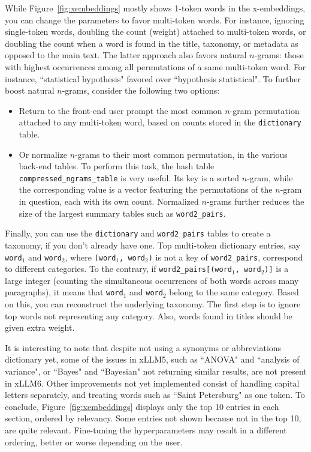 \documentclass[oneside,10pt]{book}
\begin{document}
While Figure~\ref{fig:xembeddings} mostly shows 1-token words in the x-embeddings, you can change the parameters to favor multi-token words. For instance, ignoring single-token words, doubling the count (weight) attached to multi-token words, or doubling the count when a word is found in the title, taxonomy, or metadata as opposed to the main text. The latter approach also favors natural \textcolor{index}{$n$-grams}: those with highest occurrences among all permutations of a same multi-token word. For instance, ``statistical hypothesis" favored over ``hypothesis statistical". To further boost natural $n$-grams, consider the following two options: 
\vspace{1ex}
\begin{itemize}
\item Return to the front-end user prompt the most common $n$-gram permutation attached to any multi-token word, based on counts stored in the \texttt{dictionary} table. 
\item Or  normalize $n$-grams to their most common permutation, in the various back-end tables. To perform this task, the hash table
 \texttt{compressed\_ngrams\_table} is very useful. Its key is a sorted $n$-gram, while the corresponding value is a vector 
 featuring the permutations of the $n$-gram in question, each with its own count. Normalized $n$-grams further reduces the size 
of the largest summary tables such as \texttt{word2\_pairs}. 
\end{itemize}
\vspace{1ex}
Finally, you can use the \texttt{dictionary} and \texttt{word2\_pairs} tables to create a \textcolor{index}{taxonomy}, if you don't already have one. Top multi-token dictionary entries, say \texttt{word$_1$} and \texttt{word$_2$},  where \texttt{(word$_1$, word$_2$)} is not a key of \texttt{word2\_pairs},  correspond to different categories. To the contrary,
if \texttt{word2\_pairs[(word$_1$, word$_2$)]} is a large integer (counting the simultaneous occurrences of both words across many paragraphs), it means that
\texttt{word$_1$} and \texttt{word$_2$} belong to the same category. Based on this, you can reconstruct the underlying taxonomy. The first step is to ignore top
words not representing any category. Also, words found in titles should be given extra weight. 

It is interesting to note that despite not using a synonyms or abbreviations dictionary yet, some of the issues in xLLM5, such 
as ``ANOVA" and
``analysis of variance", or ``Bayes" and ``Bayesian" not returning similar results, are not present in xLLM6. 
Other improvements not yet implemented consist of handling capital letters separately, and treating words such as
``Saint Petersburg" as one token. To conclude, Figure~\ref{fig:xembeddings} displays only the top 10 entries in each section,
ordered by relevancy. Some entries not shown because not in the top 10, are quite relevant. Fine-tuning the
 \textcolor{index}{hyperparameters} may result in a different ordering, better or worse depending on the user.
\end{document}
